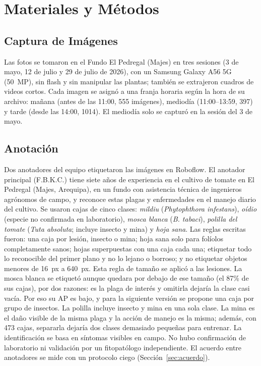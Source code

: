 \documentclass[sensors,article,submit,pdftex,moreauthors]{Definitions/mdpi}
\begin{document}
\section{Materiales y Métodos}

\subsection{\color{blue} Captura de Imágenes}

{\color{blue} Las fotos se tomaron en el Fundo El Pedregal (Majes) en tres sesiones (3 de mayo, 12 de julio y 29 de julio de 2026), con un Samsung Galaxy A56 5G (50~MP), sin flash y sin manipular las plantas; también se extrajeron cuadros de videos cortos.} {\color{blue} Cada imagen se asignó a una franja horaria según la hora de su archivo: mañana (antes de las 11:00, 555 imágenes), mediodía (11:00--13:59, 397) y tarde (desde las 14:00, 1014).} {\color{blue} El mediodía solo se capturó en la sesión del 3 de mayo.}

\subsection{\color{blue} Anotación}\label{sec:anotacion}

{\color{blue} Dos anotadores del equipo etiquetaron las imágenes en Roboflow.} {\color{blue} El anotador principal (F.B.K.C.) tiene siete años de experiencia en el cultivo de tomate en El Pedregal (Majes, Arequipa), en un fundo con asistencia técnica de ingenieros agrónomos de campo, y reconoce estas plagas y enfermedades en el manejo diario del cultivo.} {\color{blue} Se usaron cajas de cinco clases:} {\color{blue} \emph{mildiu} (\emph{Phytophthora infestans}), \emph{oídio} (especie no confirmada en laboratorio), \emph{mosca blanca} (\emph{B. tabaci}), \emph{polilla del tomate} (\emph{Tuta absoluta}; incluye insecto y mina) y \emph{hoja sana}.} {\color{blue} Las reglas escritas fueron: una caja por lesión, insecto o mina; hoja sana solo para folíolos completamente sanos; hojas superpuestas con una caja cada una; etiquetar todo lo reconocible del primer plano y no lo lejano o borroso; y no etiquetar objetos menores de 16~px a 640~px.} {\color{blue} Esta regla de tamaño se aplicó a las lesiones.} {\color{blue} La mosca blanca se etiquetó aunque quedara por debajo de ese tamaño (el 87\% de sus cajas), por dos razones: es la plaga de interés y omitirla dejaría la clase casi vacía.} {\color{blue} Por eso su AP es bajo, y para la siguiente versión se propone una caja por grupo de insectos.} {\color{blue} La polilla incluye insecto y mina en una sola clase.} {\color{blue} La mina es el daño visible de la misma plaga y la acción de manejo es la misma; además, con 473 cajas, separarla dejaría dos clases demasiado pequeñas para entrenar.} {\color{blue} La identificación se basa en síntomas visibles en campo.} {\color{blue} No hubo confirmación de laboratorio ni validación por un fitopatólogo independiente.} {\color{blue} El acuerdo entre anotadores se mide con un protocolo ciego (Sección~\ref{sec:acuerdo}).}
\end{document}
